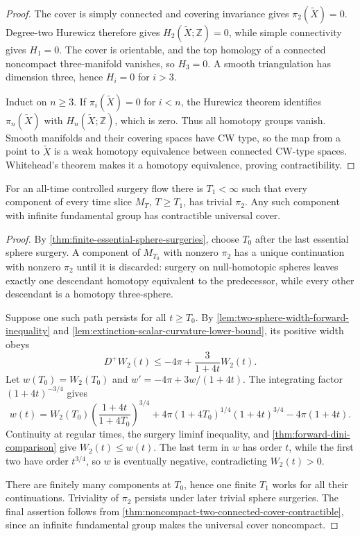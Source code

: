\begin{proof}
The cover is simply connected and covering invariance gives
$\pi_2(\widetilde X)=0$.  Degree-two Hurewicz therefore gives
$H_2(\widetilde X;\mathbb Z)=0$, while simple connectivity gives $H_1=0$.
The cover is orientable, and the top homology of a connected noncompact
three-manifold vanishes, so $H_3=0$.  A smooth triangulation has dimension
three, hence $H_i=0$ for $i>3$.

Induct on $n\ge3$.  If $\pi_i(\widetilde X)=0$ for $i<n$, the Hurewicz
theorem identifies $\pi_n(\widetilde X)$ with $H_n(\widetilde X;\mathbb Z)$,
which is zero.  Thus all homotopy groups vanish.  Smooth manifolds and their
covering spaces have CW type, so the map from a point to $\widetilde X$ is a
weak homotopy equivalence between connected CW-type spaces.  Whitehead's
theorem makes it a homotopy equivalence, proving contractibility.
\end{proof}

\begin{theorem}
\label{thm:eventual-pi2-vanishing}
\notready
For an all-time controlled surgery flow there is $T_1<\infty$ such that every
component of every time slice $M_T$, $T\ge T_1$, has trivial $\pi_2$.  Any
such component with infinite fundamental group has contractible universal
cover.
\end{theorem}

\begin{proof}
By \ref{thm:finite-essential-sphere-surgeries}, choose $T_0$ after the last
essential sphere surgery.  A component of $M_{T_0}$ with nonzero $\pi_2$ has
a unique continuation with nonzero $\pi_2$ until it is discarded: surgery on
null-homotopic spheres leaves exactly one descendant homotopy equivalent to
the predecessor, while every other descendant is a homotopy three-sphere.

Suppose one such path persists for all $t\ge T_0$.  By
\ref{lem:two-sphere-width-forward-inequality} and
\ref{lem:extinction-scalar-curvature-lower-bound}, its positive width obeys
\[
 D^+W_2(t)\le-4\pi+\frac3{1+4t}W_2(t).
\]
Let $w(T_0)=W_2(T_0)$ and
$w'=-4\pi+3w/(1+4t)$.  The integrating factor
$(1+4t)^{-3/4}$ gives
\[
 w(t)=W_2(T_0)\left(\frac{1+4t}{1+4T_0}\right)^{3/4}
 +4\pi(1+4T_0)^{1/4}(1+4t)^{3/4}-4\pi(1+4t).
\]
Continuity at regular times, the surgery liminf inequality, and
\ref{thm:forward-dini-comparison} give $W_2(t)\le w(t)$.  The last term in
$w$ has order $t$, while the first two have order $t^{3/4}$, so $w$ is
eventually negative, contradicting $W_2(t)>0$.

There are finitely many components at $T_0$, hence one finite $T_1$ works for
all their continuations.  Triviality of $\pi_2$ persists under later trivial
sphere surgeries.  The final assertion follows from
\ref{thm:noncompact-two-connected-cover-contractible}, since an infinite
fundamental group makes the universal cover noncompact.
\end{proof}
